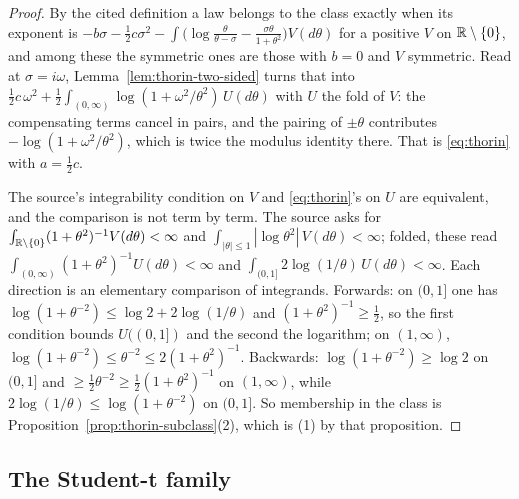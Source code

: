 \begin{proof}
By the cited definition a law belongs to the class exactly when its exponent is
$-b\sigma - \tfrac12 c\sigma^2 - \int\bigl(\log\tfrac{\theta}{\theta-\sigma}
- \tfrac{\sigma\theta}{1+\theta^2}\bigr)V(d\theta)$ for a positive $V$ on $\mathbb{R}\setminus\{0\}$,
and among these the symmetric ones are those with $b = 0$ and $V$ symmetric. Read at
$\sigma = i\omega$, Lemma~\ref{lem:thorin-two-sided} turns that into
$\tfrac12 c\,\omega^2 + \tfrac12\int_{(0,\infty)}\log(1 + \omega^2/\theta^2)\,U(d\theta)$ with
$U$ the fold of $V$: the compensating terms cancel in pairs, and the pairing of $\pm\theta$
contributes $-\log(1 + \omega^2/\theta^2)$, which is twice the modulus identity there. That is
\ref{eq:thorin} with $a = \tfrac12 c$.

The source's integrability condition on $V$ and \ref{eq:thorin}'s on $U$ are equivalent, and the
comparison is not term by term. The source asks for
$\int_{\mathbb{R}\setminus\{0\}}(1+\theta^2)^{-1}V(d\theta) < \infty$ and
$\int_{|\theta|\le1}|\log\theta^2|\,V(d\theta) < \infty$; folded, these read
$\int_{(0,\infty)}(1+\theta^2)^{-1}U(d\theta) < \infty$ and
$\int_{(0,1]}2\log(1/\theta)\,U(d\theta) < \infty$. Each direction is an elementary comparison of
integrands. Forwards: on $(0,1]$ one has $\log(1+\theta^{-2}) \le \log 2 + 2\log(1/\theta)$ and
$(1+\theta^2)^{-1} \ge \tfrac12$, so the first condition bounds $U((0,1])$ and the second the
logarithm; on $(1,\infty)$, $\log(1+\theta^{-2}) \le \theta^{-2} \le 2(1+\theta^2)^{-1}$.
Backwards: $\log(1+\theta^{-2}) \ge \log 2$ on $(0,1]$ and
$\ge \tfrac12\theta^{-2} \ge \tfrac12(1+\theta^2)^{-1}$ on $(1,\infty)$, while
$2\log(1/\theta) \le \log(1+\theta^{-2})$ on $(0,1]$. So membership in the class is
Proposition~\ref{prop:thorin-subclass}(2), which is (1) by that proposition.
\end{proof}

\subsection{The Student-t family}\label{sec:student}

